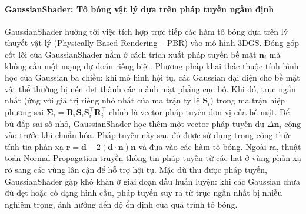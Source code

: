 \paragraph{GaussianShader: Tô bóng vật lý dựa trên pháp tuyến ngầm định}
\label{para:gaussianshader-detail}
GaussianShader \cite{jiang2024gaussianshader} hướng tới việc tích hợp trực tiếp các hàm tô bóng dựa trên lý thuyết vật lý (Physically-Based Rendering -- PBR) vào mô hình 3DGS. Đóng góp cốt lõi của GaussianShader nằm ở cách trích xuất pháp tuyến bề mặt $\mathbf{n}_i$ mà không cần một mạng dự đoán riêng biệt. Phương pháp khai thác thuộc tính hình học của Gaussian ba chiều: khi mô hình hội tụ, các Gaussian đại diện cho bề mặt vật thể thường bị nén dẹt thành các mảnh mặt phẳng cục bộ. Khi đó, trục ngắn nhất (ứng với giá trị riêng nhỏ nhất của ma trận tỷ lệ $\mathbf{S}_i$) trong ma trận hiệp phương sai $\boldsymbol{\Sigma}_i = \mathbf{R}_i \mathbf{S}_i \mathbf{S}_i^\top \mathbf{R}_i^\top$ chính là vector pháp tuyến đơn vị của bề mặt. Để bù đắp sai số nhỏ, GaussianShader học thêm một vector pháp tuyến dư $\Delta \mathbf{n}_i$ cộng vào trước khi chuẩn hóa. Pháp tuyến này sau đó được sử dụng trong công thức tính tia phản xạ $\mathbf{r} = \mathbf{d} - 2(\mathbf{d}\cdot\mathbf{n})\mathbf{n}$ và đưa vào các hàm tô bóng. Ngoài ra, thuật toán Normal Propagation truyền thông tin pháp tuyến từ các hạt ở vùng phản xạ rõ sang các vùng lân cận để hỗ trợ hội tụ. Mặc dù thu được pháp tuyến, GaussianShader gặp khó khăn ở giai đoạn đầu huấn luyện: khi các Gaussian chưa đủ dẹt hoặc có dạng hình cầu, pháp tuyến suy ra từ trục ngắn nhất bị nhiễu nghiêm trọng, ảnh hưởng đến độ ổn định của quá trình tô bóng.

